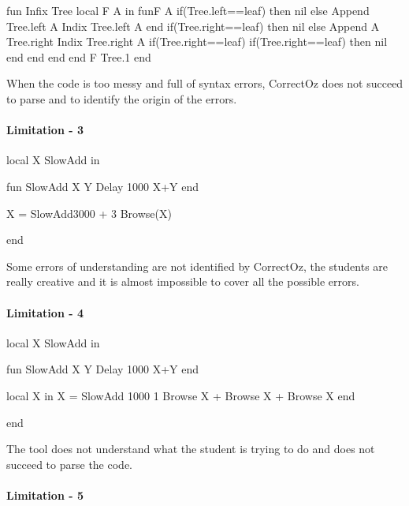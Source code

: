 \documentclass[11pt,a4paper,twoside,openright]{report}
\begin{document}
\begin{OZ}
fun {Infix Tree}
local F A in
    fun{F A}
        if(Tree.left==leaf)
        then nil
        else
            {Append Tree.left A}
            {Indix Tree.left A}
        end 
        if(Tree.right==leaf)
        then nil
        else
            {Append A Tree.right}
            {Indix Tree.right A}
            if(Tree.right==leaf)
                if(Tree.right==leaf)
                then nil
                end
            end
        end
    end
    {F Tree.1}
end
\end{OZ}

When the code is too messy and full of syntax errors, CorrectOz does not 
succeed to parse and to identify the origin of the errors.


\paragraph{Limitation - 3}
\begin{OZ}
local X SlowAdd in 
	
	fun {SlowAdd X Y}
	   	{Delay 1000}
   		X+Y   		
	end
    
    X = SlowAdd{3000 + 3}
    Browse(X)
    
end
\end{OZ}

Some errors of understanding are not identified by CorrectOz, the students are 
really creative and it is almost impossible to cover all the possible errors.
%
%	
%    
%    

\paragraph{Limitation - 4}
\begin{OZ}
local X SlowAdd in 
	
	fun {SlowAdd X Y}
	   	{Delay 1000}
   		X+Y   		
	end
    
    local X in 
    X = {SlowAdd 1000 1}
    {Browse X} + {Browse X} + {Browse X}
end
    
end
\end{OZ}

The tool does not understand what the student is trying to do and does not 
succeed to parse the code.

\paragraph{Limitation - 5}
\end{document}
